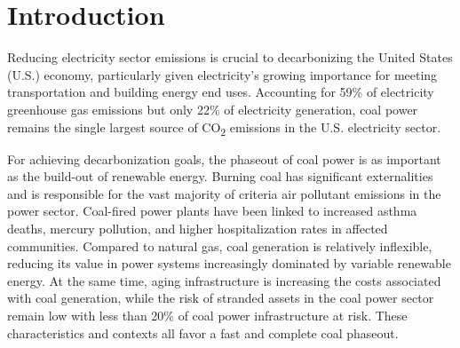 \setlength{\parindent}{20pt}
\section{Introduction}


Reducing electricity sector emissions is crucial to decarbonizing the United States (U.S.) economy, particularly given electricity's growing importance for meeting transportation and building energy end uses. Accounting for 59\% of electricity greenhouse gas emissions but only 22\% of electricity generation, coal power remains the single largest source of CO\textsubscript{2} emissions in the U.S. electricity sector.

For achieving decarbonization goals, the phaseout of coal power is as important as the build-out of renewable energy.
Burning coal has significant externalities and is responsible for the vast majority of criteria air pollutant emissions in the power sector.
Coal-fired power plants have been linked to increased asthma deaths, mercury pollution, and higher hospitalization rates in affected communities.
Compared to natural gas, coal generation is relatively inflexible, reducing its value in power systems increasingly dominated by variable renewable energy. At the same time, aging infrastructure is increasing the costs associated with coal generation, while
the risk of stranded assets in the coal power sector remain low with less than 20\% of coal power infrastructure at risk.
These characteristics and contexts all favor a fast and complete coal phaseout. 

